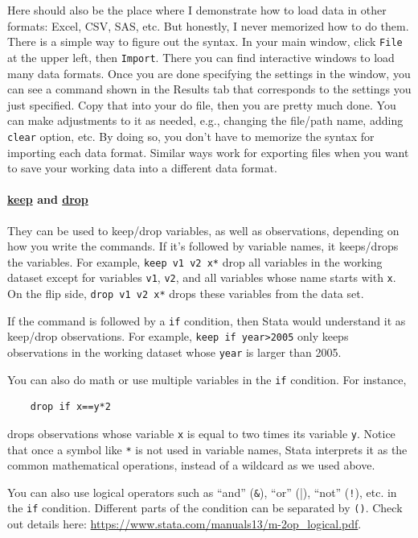 Here should also be the place where I demonstrate how to load data in other formats: Excel, CSV, SAS, etc. But honestly, I never memorized how to do them. There is a simple way to figure out the syntax. In your main window, click \verb|File| at the upper left, then \verb|Import|. There you can find interactive windows to load many data formats. Once you are done specifying the settings in the window, you can see a command shown in the Results tab that corresponds to the settings you just specified. Copy that into your do file, then you are pretty much done. You can make adjustments to it as needed, e.g., changing the file/path name, adding \verb|clear| option, etc. By doing so, you don't have to memorize the syntax for importing each data format. Similar ways work for exporting files when you want to save your working data into a different data format. 

\paragraph{\underline{keep} and  \underline{drop}} They can be used to keep/drop variables, as well as observations, depending on how you write the commands. If it's followed by variable names, it keeps/drops the variables. For example, \verb|keep v1 v2 x*| drop all variables in the working dataset except for variables \verb|v1|, \verb|v2|, and all variables whose name starts with \verb|x|. On the flip side, \verb|drop v1 v2 x*| drops these variables from the data set. 

If the command is followed by a \verb|if| condition, then Stata would understand it as keep/drop observations. For example, \verb|keep if year>2005| only keeps observations in the working dataset whose \verb|year| is larger than 2005. 

You can also do math or use multiple variables in the \verb|if| condition. For instance, 
\begin{verbatim}
    drop if x==y*2
\end{verbatim}
drops observations whose variable \verb|x| is equal to two times its variable \verb|y|. Notice that once a symbol like \verb|*| is not used in variable names, Stata interprets it as the common mathematical operations, instead of a wildcard as we used above. 

You can also use logical operators such as ``and'' (\verb|&|), ``or'' (\verb|||), ``not'' (\verb|!|), etc. in the \verb|if| condition. Different parts of the condition can be separated by \verb|()|. Check out details here: \url{https://www.stata.com/manuals13/m-2op_logical.pdf}.

